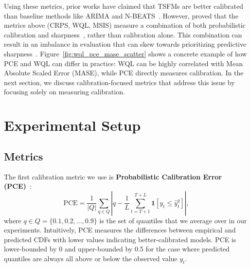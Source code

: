 \documentclass{article}
\begin{document}
Using these metrics, prior works have claimed that TSFMs are better calibrated than baseline methods like ARIMA and N-BEATS~\citep{gifteval,chronos,tirex}. 
However, \cite{beyondpinball} proved that the metrics above (CRPS, WQL, MSIS) measure a combination of both probabilistic calibration and sharpness~\citep{probforcasttext}, rather than calibration alone.
This combination can result in an imbalance in evaluation that can skew towards prioritizing predictive sharpness~\citep{beyondpinball}. 
Figure~\ref{fig:wql_pce_mase_scatter} shows a concrete example of how PCE and WQL can differ in practice: WQL can be highly correlated with Mean Absolute Scaled Error (MASE), while PCE directly measures calibration. 
In the next section, we discuss calibration-focused metrics that address this issue by focusing solely on measuring calibration.


\section{Experimental Setup}
\label{sec:experimental_setup}
 

\subsection{Metrics}
\label{sec:metrics}

The first calibration metric we use is \textbf{Probabilistic Calibration Error (PCE)}~\citep{calibratedregression,calibrationNN}:
\begin{equation}
    \mbox{PCE}  = \frac{1}{|Q|} \sum_{q\in Q}\left|q - \frac{1}{L}\sum_{t=T+1}^{T+L} \mathbf{1}[y_t \leq \hat{y}^q_t]\right|,
\end{equation}
where $q \in Q = \{0.1, 0.2, ..., 0.9\}$ is the set of quantiles that we average over in our experiments.
Intuitively, PCE measures the differences between empirical and predicted CDFs with lower values indicating better-calibrated models. 
PCE is lower-bounded by 0 and upper-bounded by 0.5 for the case where predicted quantiles are always all above or below the observed value $y_t$. 
\end{document}
